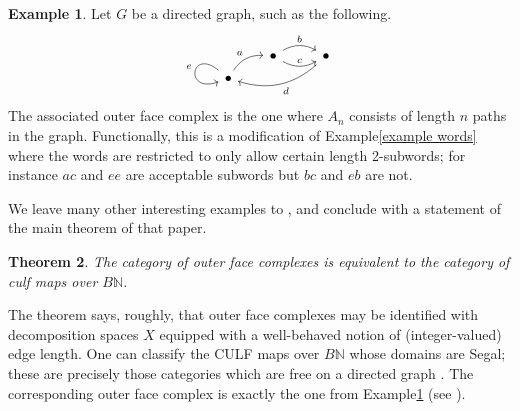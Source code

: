 \documentclass{conm-p-l}
\newtheorem{theorem}{Theorem}[section]
\theoremstyle{definition}
\newtheorem{example}[theorem]{Example}
\newtheorem{exercise}[theorem]{Exercise}
\theoremstyle{remark}
\begin{document}
\begin{example}\label{ex dir graph}
Let $G$ be a directed graph, such as the following.
\[ \begin{tikzcd}[row sep=tiny]
&[-0.2cm] \bullet \rar[bend left,"b"] \rar[bend right,"c"] & \bullet \ar[lld, bend left, "d"]  \\
\bullet \ar[ur, bend left,"a"] \ar[in=200, out=140, loop,"e"']
\end{tikzcd} \]
The associated outer face complex is the one where $A_n$ consists of length $n$ paths in the graph.
Functionally, this is a modification of Example\nobreakspace \ref {example words} where the words are restricted to only allow certain length 2-subwords; for instance $ac$ and $ee$ are acceptable subwords but $bc$ and $eb$ are not.
\end{example}

We leave many other interesting examples to \cite{HackneyKock:FDS}, and conclude with a statement of the main theorem of that paper.

\begin{theorem}
The category of outer face complexes is equivalent to the category of culf maps over $B\mathbb{N}$.
\end{theorem}

The theorem says, roughly, that outer face complexes may be identified with decomposition spaces $X$ equipped with a well-behaved notion of (integer-valued) edge length.
One can classify the CULF maps over $B\mathbb{N}$ whose domains are Segal; these are precisely those categories which are free on a directed graph \cite[\S1]{Street:CS}.
The corresponding outer face complex is exactly the one from Example\nobreakspace \ref {ex dir graph} (see \cite[4.1]{HackneyKock:FDS}).

\end{document}
